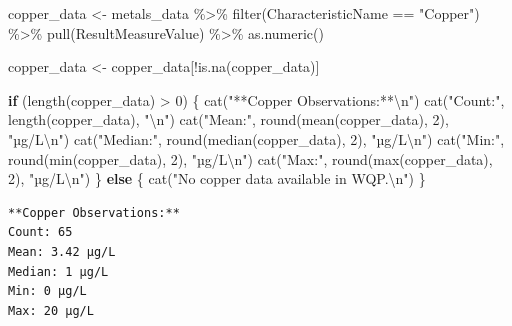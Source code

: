 \documentclass[
  letterpaper,
]{scrbook}
\newenvironment{Shaded}{\begin{snugshade}}{\end{snugshade}}
\newcommand{\ControlFlowTok}[1]{\textcolor[rgb]{0.00,0.23,0.31}{\textbf{#1}}}
\newcommand{\DecValTok}[1]{\textcolor[rgb]{0.68,0.00,0.00}{#1}}
\newcommand{\FunctionTok}[1]{\textcolor[rgb]{0.28,0.35,0.67}{#1}}
\newcommand{\NormalTok}[1]{\textcolor[rgb]{0.00,0.23,0.31}{#1}}
\newcommand{\OtherTok}[1]{\textcolor[rgb]{0.00,0.23,0.31}{#1}}
\newcommand{\SpecialCharTok}[1]{\textcolor[rgb]{0.37,0.37,0.37}{#1}}
\newcommand{\StringTok}[1]{\textcolor[rgb]{0.13,0.47,0.30}{#1}}
\begin{document}
\begin{Shaded}
\begin{Highlighting}[]
\NormalTok{copper\_data }\OtherTok{\textless{}{-}}\NormalTok{ metals\_data }\SpecialCharTok{\%\textgreater{}\%}
  \FunctionTok{filter}\NormalTok{(CharacteristicName }\SpecialCharTok{==} \StringTok{"Copper"}\NormalTok{) }\SpecialCharTok{\%\textgreater{}\%}
  \FunctionTok{pull}\NormalTok{(ResultMeasureValue) }\SpecialCharTok{\%\textgreater{}\%}
  \FunctionTok{as.numeric}\NormalTok{()}

\NormalTok{copper\_data }\OtherTok{\textless{}{-}}\NormalTok{ copper\_data[}\SpecialCharTok{!}\FunctionTok{is.na}\NormalTok{(copper\_data)]}

\ControlFlowTok{if}\NormalTok{ (}\FunctionTok{length}\NormalTok{(copper\_data) }\SpecialCharTok{\textgreater{}} \DecValTok{0}\NormalTok{) \{}
  \FunctionTok{cat}\NormalTok{(}\StringTok{"**Copper Observations:**}\SpecialCharTok{\textbackslash{}n}\StringTok{"}\NormalTok{)}
  \FunctionTok{cat}\NormalTok{(}\StringTok{"Count:"}\NormalTok{, }\FunctionTok{length}\NormalTok{(copper\_data), }\StringTok{"}\SpecialCharTok{\textbackslash{}n}\StringTok{"}\NormalTok{)}
  \FunctionTok{cat}\NormalTok{(}\StringTok{"Mean:"}\NormalTok{, }\FunctionTok{round}\NormalTok{(}\FunctionTok{mean}\NormalTok{(copper\_data), }\DecValTok{2}\NormalTok{), }\StringTok{"µg/L}\SpecialCharTok{\textbackslash{}n}\StringTok{"}\NormalTok{)}
  \FunctionTok{cat}\NormalTok{(}\StringTok{"Median:"}\NormalTok{, }\FunctionTok{round}\NormalTok{(}\FunctionTok{median}\NormalTok{(copper\_data), }\DecValTok{2}\NormalTok{), }\StringTok{"µg/L}\SpecialCharTok{\textbackslash{}n}\StringTok{"}\NormalTok{)}
  \FunctionTok{cat}\NormalTok{(}\StringTok{"Min:"}\NormalTok{, }\FunctionTok{round}\NormalTok{(}\FunctionTok{min}\NormalTok{(copper\_data), }\DecValTok{2}\NormalTok{), }\StringTok{"µg/L}\SpecialCharTok{\textbackslash{}n}\StringTok{"}\NormalTok{)}
  \FunctionTok{cat}\NormalTok{(}\StringTok{"Max:"}\NormalTok{, }\FunctionTok{round}\NormalTok{(}\FunctionTok{max}\NormalTok{(copper\_data), }\DecValTok{2}\NormalTok{), }\StringTok{"µg/L}\SpecialCharTok{\textbackslash{}n}\StringTok{"}\NormalTok{)}
\NormalTok{\} }\ControlFlowTok{else}\NormalTok{ \{}
  \FunctionTok{cat}\NormalTok{(}\StringTok{"No copper data available in WQP.}\SpecialCharTok{\textbackslash{}n}\StringTok{"}\NormalTok{)}
\NormalTok{\}}
\end{Highlighting}
\end{Shaded}

\begin{verbatim}
**Copper Observations:**
Count: 65 
Mean: 3.42 µg/L
Median: 1 µg/L
Min: 0 µg/L
Max: 20 µg/L
\end{verbatim}
\end{document}
